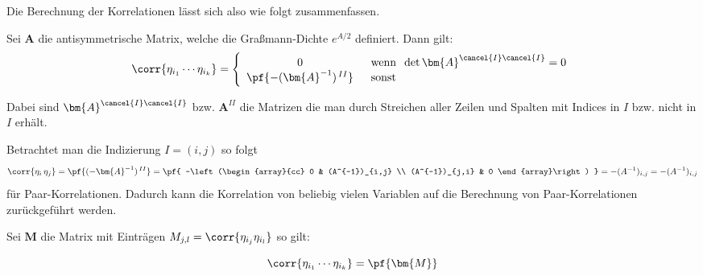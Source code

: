 \noindent Die Berechnung der Korrelationen lässt sich also wie folgt zusammenfassen.

\begin{grayframe}[frametitle = {Graßmann-Korrelationen von Monomen}]
Sei $\bm{A}$ die antisymmetrische Matrix, welche die Graßmann-Dichte $e^{A/2}$ definiert. Dann gilt:
\begin{equation} \label{eq: Calculate_GV_Corr}
    \corr{\eta_{i_1} \cdots \eta_{i_k}}
    =  \left\{ \begin{array}{cl} 0 & \;\;\text{wenn}\;\; \det{\bm{A}^{\cancel{I} \cancel{I}}} = 0 \\ \pf{-(\bm{A}^{-1})^{\,II}} & \;\; \text{sonst} \end{array} \right. 
\end{equation} 

\noindent Dabei sind $\bm{A}^{\cancel{I} \cancel{I}}$ bzw. $\bm{A}^{II}$ die Matrizen die man durch Streichen aller Zeilen und Spalten mit Indices in $I$ bzw. nicht in $I$ erhält.
\end{grayframe}

\noindent Betrachtet man die Indizierung $I=(i,j)$ so folgt
\begin{equation}
\corr{\eta_i\,\eta_j} 
    = \pf{(-\bm{A}^{-1})^{\,II} }
    = \pf{  
    -\left(\begin{array}{cc} 
        0 & (A^{-1})_{i,j}     \\
        (A^{-1})_{j,i} & 0
    \end{array}\right) }
    = -(A^{-1})_{i,j} 
    = - (A^{-1})_{i,j}  \nonumber
\end{equation}
für Paar-Korrelationen. Dadurch kann die Korrelation von beliebig vielen Variablen auf die Berechnung von Paar-Korrelationen zurückgeführt werden.

\begin{grayframe}[frametitle = {Berechnung von Monom Korrelation mit Paar-Korrelationen}]
Sei $\bm{M}$ die Matrix mit Einträgen $M_{j,l} = \corr{\eta_{i_j} \eta_{i_l}}$ so gilt:

\begin{equation} \label{eq: calc monom corr with pair corr matrix}
    \corr{\eta_{i_1} \cdots \eta_{i_k}}
    =  \pf{\bm{M}}
\end{equation} 

\end{grayframe}